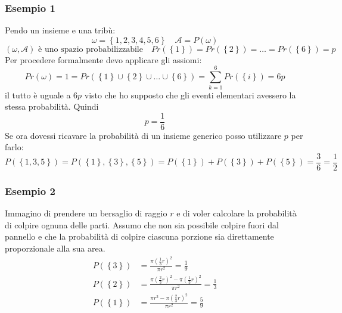 \subsubsection*{Esempio 1}
Pendo un insieme e una tribù:
\[
	\omega = \left\{1,2,3,4,5,6\right\} \quad \mathcal{A} = P\left(\omega\right)
\]
\[
	\left(\omega , \mathcal{A} \right) \text{ è uno spazio probabilizzabile} \quad Pr\left(\left\{1\right\}\right)= Pr\left(\left\{2\right\}\right) = \ldots = Pr\left(\left\{6\right\}\right) = p
\]
Per procedere formalmente devo applicare gli assiomi:
\[
	Pr\left(\omega \right)= 1= Pr\left(\left\{1\right\} \cup  \left\{2\right\} \cup   \ldots \cup  \left\{6\right\} \right)= \sum_{k=1}^{6} Pr\left(\left\{i\right\}\right) = 6p
\]
il tutto è uguale a $ 6p $ visto che ho supposto che gli eventi elementari avessero la stessa probabilità. Quindi
\[
	p=\frac{1}{6}
\]
Se ora dovessi ricavare la probabilità di un insieme generico posso utilizzare $ p $ per farlo:
\[
	P\left(\left\{1,3,5\right\}\right) = P\left(\left\{1\right\},\left\{3\right\},\left\{5\right\}\right)=P\left(\left\{1\right\}\right)+ P\left(\left\{3\right\}\right) + P\left(\left\{5\right\}\right)=\frac{3}{6} = \frac{1}{2}
\]
\subsubsection*{Esempio 2}
Immagino di prendere un bersaglio di raggio $ r $ e di voler calcolare la probabilità di colpire ognuna delle parti. Assumo che non sia possibile colpire fuori dal pannello e che la probabilità di colpire ciascuna porzione sia direttamente proporzionale alla sua area.
\begin{align*}
	P\left(\left\{3\right\}\right) & = \frac{\pi \left(\frac{1}{3}r\right)^2}{\pi r^2} = \frac{1}{9}                                   \\
	P\left(\left\{2\right\}\right) & = \frac{\pi \left(\frac{2}{3}r\right)^2 - \pi \left(\frac{1}{3}r\right)^2}{\pi r^2} = \frac{1}{3} \\
	P\left(\left\{1\right\}\right) & = \frac{\pi r^2 - \pi \left(\frac{2}{3} r\right)^2 }{\pi r^2 } = \frac{5}{9}
\end{align*}
